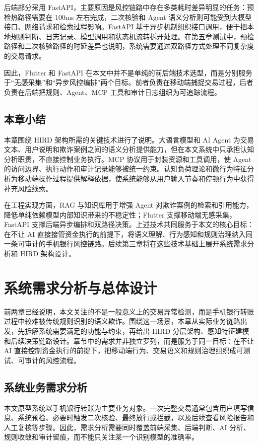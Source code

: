 \documentclass{xduugthesis}
\begin{document}
后端部分采用 FastAPI，主要原因是风控链路中存在多类耗时差异明显的任务：预检热路径需要在 100ms 左右完成，二次核验和 Agent 语义分析则可能受到大模型接口、网络请求和检索过程影响。FastAPI 基于异步机制组织接口调用，便于把本地规则判断、日志记录、模型调用和状态机流转拆开处理。在第五章测试中，预检路径和二次核验路径的时延差异也说明，系统需要通过双路径方式处理不同复杂度的交易请求。

因此，Flutter 和 FastAPI 在本文中并不是单纯的前后端技术选型，而是分别服务于“无感采集”和“异步风控编排”两个目标。前者负责在移动端捕捉交易过程，后者负责在后端把规则、Agent、MCP 工具和审计日志组织为可追踪流程。

\section{本章小结}
本章围绕 HIRD 架构所需的关键技术进行了说明。大语言模型和 AI Agent 为交易文本、用户说明和欺诈案例之间的语义分析提供能力，但在本文系统中只承担认知分析职责，不直接控制业务执行。MCP 协议用于封装资源和工具调用，使 Agent 的访问边界、执行动作和审计记录能够被统一约束。认知负荷理论和微行为特征分析为移动端操作过程提供解释依据，使系统能够从用户输入节奏和停顿行为中获得补充风险线索。

在工程实现方面，RAG 与知识库用于增强 Agent 对欺诈案例的检索和引用能力，降低单纯依赖模型内部知识带来的不稳定性；Flutter 支撑移动端无感采集，FastAPI 支撑后端异步编排和双路径决策。上述技术共同服务于本文的核心目标：在不让 AI 直接接管资金执行的前提下，将语义理解、行为感知和规则治理纳入同一条可审计的手机银行风控链路。后续第三章将在这些技术基础上展开系统需求分析和 HIRD 架构设计。

\chapter{系统需求分析与总体设计}

前两章已经说明，本文关注的不是一般意义上的交易异常检测，而是手机银行转账过程中较难被传统规则识别的语义欺诈。围绕这一场景，本章从实际业务链路出发，先拆解系统需要满足的功能与约束，再给出 HIRD 分层架构、感知特征建模和后续决策链路设计。章节中的需求并非独立罗列，而是服务于同一目标：在不让 AI 直接控制资金执行的前提下，把移动端行为、交易语义和规则治理组织成可测试、可审计的风控流程。

\section{系统业务需求分析}

本文原型系统以手机银行转账为主要业务对象。一次完整交易通常包含用户填写信息、系统预检、必要时触发二次核验、最终放行或拦截，以及后续查看风险报告和人工复核等步骤。因此，需求分析需要同时覆盖前端采集、后端判断、AI 分析、规则收敛和审计留痕，而不能只关注某一个识别模型的准确率。
\end{document}
